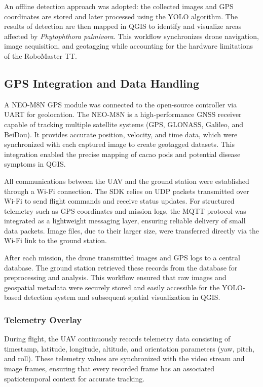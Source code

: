 An offline detection approach was adopted: the collected images and GPS coordinates are stored and later processed using the YOLO algorithm. The results of detection are then mapped in QGIS to identify and visualize areas affected by \textit{Phytophthora palmivora}. This workflow synchronizes drone navigation, image acquisition, and geotagging while accounting for the hardware limitations of the RoboMaster TT.

\subsection*{GPS Integration and Data Handling}
A NEO-M8N GPS module was connected to the open-source controller via UART for geolocation. The NEO-M8N is a high-performance GNSS receiver capable of tracking multiple satellite systems (GPS, GLONASS, Galileo, and BeiDou). It provides accurate position, velocity, and time data, which were synchronized with each captured image to create geotagged datasets. This integration enabled the precise mapping of cacao pods and potential disease symptoms in QGIS.

All communications between the UAV and the ground station were established through a Wi-Fi connection. The SDK relies on UDP packets transmitted over Wi-Fi to send flight commands and receive status updates. For structured telemetry such as GPS coordinates
and mission logs, the MQTT protocol was integrated as a lightweight messaging layer, ensuring reliable delivery of small data packets. Image files, due to their larger size, were transferred directly via the Wi-Fi link to the ground station.

After each mission, the drone transmitted images and GPS logs to a central database. The ground station retrieved these records from the database for preprocessing and analysis. This workflow ensured that raw images and geospatial metadata were securely stored and easily accessible for the YOLO-based detection system and subsequent
spatial visualization in QGIS.

\subsubsection*{Telemetry Overlay}

During flight, the UAV continuously records telemetry data consisting of timestamp, latitude, longitude, altitude, and orientation parameters (yaw, pitch, and roll). These telemetry values are synchronized with the video stream and image frames, ensuring that every recorded frame has an associated spatiotemporal context for accurate tracking.

